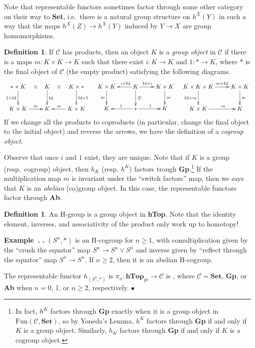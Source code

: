 \documentclass[12pt]{article}
\makeatletter
\theoremstyle{plain}
\theoremstyle{definition}
\newtheorem{definition}[equation]{Definition}
\newenvironment{example}[1][]{%
    \begin{trivlist} \item[]%
    \refstepcounter{equation}\textbf{Example~\theequation}%
    \@ifnotempty{#1}{\the\thm@notefont \ (#1)}\textbf{.} }%
    {\hspace*{\fill}$\bullet$ \end{trivlist}}
\theoremstyle{remark}
\renewcommand{\theequation}{\thesection.\arabic{equation}}
\newcommand\C{\mathcal{C}}
\newcommand{\id}{\mathrm{Id}}
\makeatother
\begin{document}
 Note that representable functors sometimes factor through some other category on their
 way to \textbf{Set}, i.e.\ there is a natural group structure on $h^X(Y)$ in
 such a way that the maps $h^X(Z)\to h^X(Y)$ induced by $Y\to X$ are group homomorphisms.
 \begin{definition}
   If $\C$ has products, then an object $K$ is a \emph{group object} in $\C$ if there is
   a maps $m:K\times K\to K$ such that there exist $i:K\to K$ and $1:*\to K$, where $*$
   is the final object of $\C$ (the empty product) satisfying the following diagrams.
   \[\xymatrix{
    {*}\times K\ar[d]_{1\times \id} \ar@{}[r]|(.6){\cong} & K\ar@{}[r]|(.4){\cong} \ar[d]^{\id}
    & K\times *\ar[d]^{\id\times 1}\\
    K\times K\ar[r]^(.6)m & K & K\times K \ar[l]_(.6)m
   }\quad
   \xymatrix{
    K\times K \ar[d]_m &
    K \ar[d]^{\exists !} \ar[r]^(.4){\id\times i} \ar[l]_(.35){i\times \id}
    & K\times K \ar[d]^m\\
    K & {*}\ar[r]^1 \ar[l]_1 & K
   }\quad
   \xymatrix{
    K\times K\times K \ar[r]^(.57){m\times \id} \ar[d]_{\id \times m} & K\times K\ar[d]^m\\
    K\times K\ar[r]^(.6)m & K
   }\]
   If we change all the products to coproducts (in particular, change the final object to
   the initial object) and reverse the arrows, we have the definition of a \emph{cogroup
   object}.
 \end{definition}
 Observe that once $i$ and $1$ exist, they are unique. Note that if $K$ is a group
 (resp.\ cogroup) object, then $h_K$ (resp. $h^K$) factors trough
 \textbf{Gp}.\footnote{In fact, $h^K$ factors through \textbf{Gp} exactly when it is a
 group object in $\textrm{Fun}(\C,\textbf{Set})$, so by Yoneda's Lemma, $h^K$ factors
 through \textbf{Gp} if and only if $K$ is a group object. Similarly, $h_K$ factors
 through \textbf{Gp} if and only if $K$ is a cogroup object.} If the multiplication map
 $m$ is invariant under the ``switch factors'' map, then we says that $K$ is an
 \emph{abelian} (co)group object. In this case, the representable functors factor through
 \textbf{Ab}.
 \begin{definition}
   An H-group is a group object in \textbf{hTop}. Note that the identity element,
   inverses, and associativity of the product only work up to homotopy!
 \end{definition}
 \begin{example}
   $(S^n,*)$ is an H-cogroup for $n\ge 1$, with comultiplication given by the ``crush the
   equator'' map $S^n\to S^n\vee S^n$ and inverse given by ``reflect through the
   equator'' map $S^n\to S^n$. If $n\ge 2$, then it is an abelian H-cogroup.

   The representable functor $h_{(S^n,*)}$ is $\pi_n:\textbf{hTop}_{pt}\to \C$ is , where
   $\C=\textbf{Set}$, \textbf{Gp}, or \textbf{Ab} when $n=0$, 1, or $n\ge 2$,
   respectively.
 \end{example}
\end{document}
